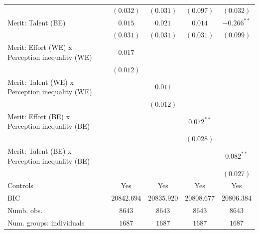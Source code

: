 \documentclass[
  12pt,
]{article}
\begin{document}
\begin{table}
\begin{center}
{\begin{tabular}{l c c c c}
                                                              & $(0.032)$      & $(0.031)$      & $(0.097)$      & $(0.032)$      \\
Merit: Talent (BE)                                            & $0.015$        & $0.021$        & $0.014$        & $-0.266^{**}$  \\
                                                              & $(0.031)$      & $(0.031)$      & $(0.031)$      & $(0.099)$      \\
Merit: Effort (WE) x Perception inequality (WE)               & $0.017$        &                &                &                \\
                                                              & $(0.012)$      &                &                &                \\
Merit: Talent (WE) x Perception inequality (WE)               &                & $0.011$        &                &                \\
                                                              &                & $(0.012)$      &                &                \\
Merit: Effort (BE) x Perception inequality (BE)               &                &                & $0.072^{**}$   &                \\
                                                              &                &                & $(0.028)$      &                \\
Merit: Talent (BE) x Perception inequality (BE)               &                &                &                & $0.082^{**}$   \\
                                                              &                &                &                & $(0.027)$      \\
\hline
Controls                                                      & Yes            & Yes            & Yes            & Yes            \\
BIC                                                           & $20842.694$    & $20835.920$    & $20808.677$    & $20806.384$    \\
Numb. obs.                                                    & $8643$         & $8643$         & $8643$         & $8643$         \\
Num. groups: individuals                                      & $1687$         & $1687$         & $1687$         & $1687$         \\

\end{tabular}}
\end{center}
\end{table}
\end{document}
